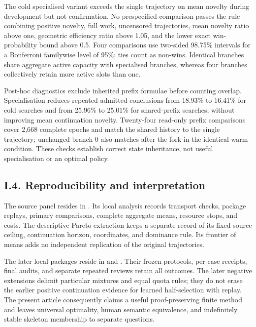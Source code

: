 \documentclass[pdflatex,sn-basic,Numbered]{sn-jnl}
\begin{document}
\endgroup

The cold specialised variant exceeds the single trajectory on mean novelty during development but not confirmation. No prespecified comparison passes the rule combining positive novelty, full work, uncensored trajectories, mean novelty ratio above one, geometric efficiency ratio above 1.05, and the lower exact win-probability bound above 0.5. Four comparisons use two-sided 98.75\% intervals for a Bonferroni familywise level of 95\%; ties count as non-wins. Identical branches share aggregate active capacity with specialised branches, whereas four branches collectively retain more active slots than one.

Post-hoc diagnostics exclude inherited prefix formulae before counting overlap. Specialisation reduces repeated admitted conclusions from 18.93\% to 16.41\% for cold searches and from 25.96\% to 25.01\% for shared-prefix searches, without improving mean continuation novelty. Twenty-four read-only prefix comparisons cover 2,668 complete epochs and match the shared history to the single trajectory; unchanged branch 0 also matches after the fork in the identical warm condition. These checks establish correct state inheritance, not useful specialisation or an optimal policy.

\subsection*{I.4. Reproducibility and interpretation}\label{i.4.-reproducibility-and-interpretation}

The source panel resides in . Its local analysis records transport checks, package replays, primary comparisons, complete aggregate means, resource stops, and costs. The descriptive Pareto extraction keeps a separate record of its fixed source ceiling, continuation horizon, coordinates, and dominance rule. Its frontier of means adds no independent replication of the original trajectories.

The later local packages reside in  and . Their frozen protocols, per-case receipts, final audits, and separate repeated reviews retain all outcomes. The later negative extensions delimit particular mixtures and equal quota rules; they do not erase the earlier positive continuation evidence for learned half-selection with replay. The present article consequently claims a useful proof-preserving finite method and leaves universal optimality, human semantic equivalence, and indefinitely stable skeleton membership to separate questions.
\end{document}
